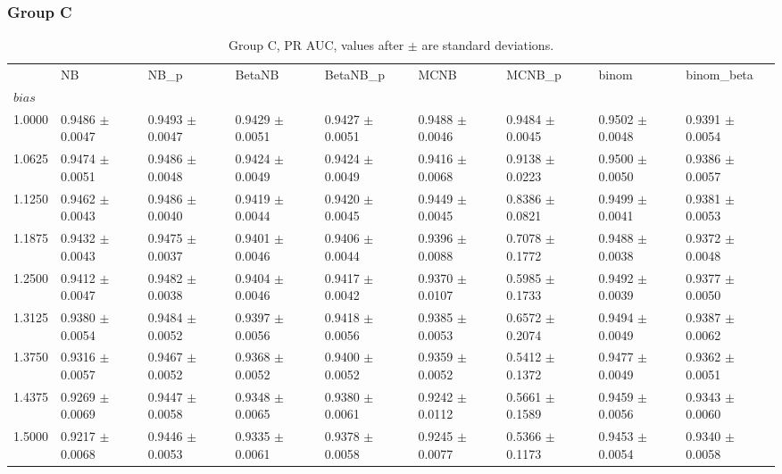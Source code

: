 \subsubsection*{Group C}
\begin{table}[H]
\centering
\begin{adjustbox}{max width=\linewidth}
\begin{tabular}{lllllllll}
\toprule
 & NB & NB\_p & BetaNB & BetaNB\_p & MCNB & MCNB\_p & binom & binom\_beta \\
$bias$ &  &  &  &  &  &  &  &  \\
\midrule
1.0000 & 0.9486 $\pm$ 0.0047 & 0.9493 $\pm$ 0.0047 & 0.9429 $\pm$ 0.0051 & 0.9427 $\pm$ 0.0051 & 0.9488 $\pm$ 0.0046 & 0.9484 $\pm$ 0.0045 & 0.9502 $\pm$ 0.0048 & 0.9391 $\pm$ 0.0054 \\
1.0625 & 0.9474 $\pm$ 0.0051 & 0.9486 $\pm$ 0.0048 & 0.9424 $\pm$ 0.0049 & 0.9424 $\pm$ 0.0049 & 0.9416 $\pm$ 0.0068 & 0.9138 $\pm$ 0.0223 & 0.9500 $\pm$ 0.0050 & 0.9386 $\pm$ 0.0057 \\
1.1250 & 0.9462 $\pm$ 0.0043 & 0.9486 $\pm$ 0.0040 & 0.9419 $\pm$ 0.0044 & 0.9420 $\pm$ 0.0045 & 0.9449 $\pm$ 0.0045 & 0.8386 $\pm$ 0.0821 & 0.9499 $\pm$ 0.0041 & 0.9381 $\pm$ 0.0053 \\
1.1875 & 0.9432 $\pm$ 0.0043 & 0.9475 $\pm$ 0.0037 & 0.9401 $\pm$ 0.0046 & 0.9406 $\pm$ 0.0044 & 0.9396 $\pm$ 0.0088 & 0.7078 $\pm$ 0.1772 & 0.9488 $\pm$ 0.0038 & 0.9372 $\pm$ 0.0048 \\
1.2500 & 0.9412 $\pm$ 0.0047 & 0.9482 $\pm$ 0.0038 & 0.9404 $\pm$ 0.0046 & 0.9417 $\pm$ 0.0042 & 0.9370 $\pm$ 0.0107 & 0.5985 $\pm$ 0.1733 & 0.9492 $\pm$ 0.0039 & 0.9377 $\pm$ 0.0050 \\
1.3125 & 0.9380 $\pm$ 0.0054 & 0.9484 $\pm$ 0.0052 & 0.9397 $\pm$ 0.0056 & 0.9418 $\pm$ 0.0056 & 0.9385 $\pm$ 0.0053 & 0.6572 $\pm$ 0.2074 & 0.9494 $\pm$ 0.0049 & 0.9387 $\pm$ 0.0062 \\
1.3750 & 0.9316 $\pm$ 0.0057 & 0.9467 $\pm$ 0.0052 & 0.9368 $\pm$ 0.0052 & 0.9400 $\pm$ 0.0052 & 0.9359 $\pm$ 0.0052 & 0.5412 $\pm$ 0.1372 & 0.9477 $\pm$ 0.0049 & 0.9362 $\pm$ 0.0051 \\
1.4375 & 0.9269 $\pm$ 0.0069 & 0.9447 $\pm$ 0.0058 & 0.9348 $\pm$ 0.0065 & 0.9380 $\pm$ 0.0061 & 0.9242 $\pm$ 0.0112 & 0.5661 $\pm$ 0.1589 & 0.9459 $\pm$ 0.0056 & 0.9343 $\pm$ 0.0060 \\
1.5000 & 0.9217 $\pm$ 0.0068 & 0.9446 $\pm$ 0.0053 & 0.9335 $\pm$ 0.0061 & 0.9378 $\pm$ 0.0058 & 0.9245 $\pm$ 0.0077 & 0.5366 $\pm$ 0.1173 & 0.9453 $\pm$ 0.0054 & 0.9340 $\pm$ 0.0058 \\
\bottomrule
\end{tabular}

\end{adjustbox}
\caption{Group C, PR AUC, values after $\pm$ are standard deviations.}
\end{table}

